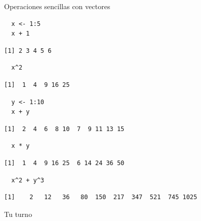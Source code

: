 \documentclass[xcolor={usenames,svgnames,dvipsnames}]{beamer}
\begin{document}
\begin{frame}[fragile,label=sec-2-1-4]{Operaciones sencillas con vectores}
 \lstset{language=R,label= ,caption= ,numbers=none}
\begin{lstlisting}
  x <- 1:5
  x + 1
\end{lstlisting}

\begin{verbatim}
[1] 2 3 4 5 6
\end{verbatim}

\lstset{language=R,label= ,caption= ,numbers=none}
\begin{lstlisting}
  x^2
\end{lstlisting}

\begin{verbatim}
[1]  1  4  9 16 25
\end{verbatim}

\lstset{language=R,label= ,caption= ,numbers=none}
\begin{lstlisting}
  y <- 1:10
  x + y
\end{lstlisting}

\begin{verbatim}
[1]  2  4  6  8 10  7  9 11 13 15
\end{verbatim}

\lstset{language=R,label= ,caption= ,numbers=none}
\begin{lstlisting}
  x * y
\end{lstlisting}

\begin{verbatim}
[1]  1  4  9 16 25  6 14 24 36 50
\end{verbatim}

\lstset{language=R,label= ,caption= ,numbers=none}
\begin{lstlisting}
  x^2 + y^3
\end{lstlisting}

\begin{verbatim}
[1]    2   12   36   80  150  217  347  521  745 1025
\end{verbatim}
\end{frame}



\begin{frame}[label=sec-2-1-5]{Tu turno}
\end{frame}
\end{document}
